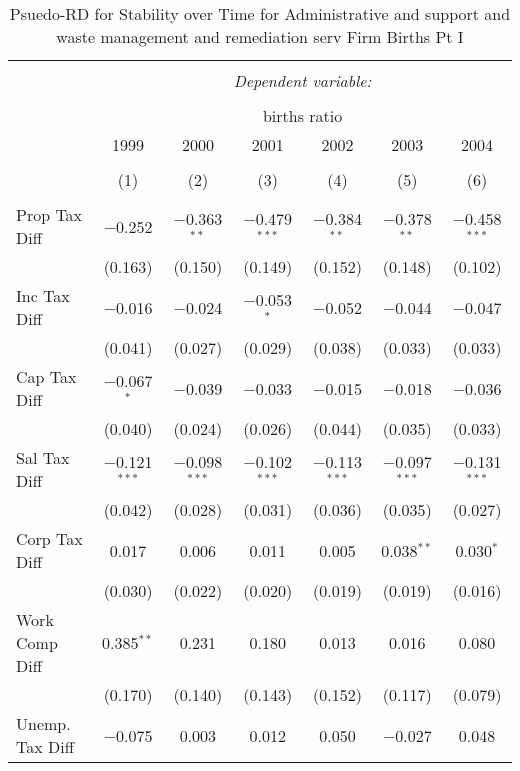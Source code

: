 
\begin{table}[!htbp] \centering 
  \caption{Psuedo-RD for Stability over Time for  Administrative and support and waste management and remediation serv Firm Births Pt I} 
  \label{56year} 
\small 
\begin{tabular}{@{\extracolsep{5pt}}lcccccc} 
\\[-1.8ex]\hline 
\hline \\[-1.8ex] 
 & \multicolumn{6}{c}{\textit{Dependent variable:}} \\ 
\cline{2-7} 
\\[-1.8ex] & \multicolumn{6}{c}{births ratio} \\ 
 & 1999 & 2000 & 2001 & 2002 & 2003 & 2004 \\ 
\\[-1.8ex] & (1) & (2) & (3) & (4) & (5) & (6)\\ 
\hline \\[-1.8ex] 
 Prop Tax Diff & $-$0.252 & $-$0.363$^{**}$ & $-$0.479$^{***}$ & $-$0.384$^{**}$ & $-$0.378$^{**}$ & $-$0.458$^{***}$ \\ 
  & (0.163) & (0.150) & (0.149) & (0.152) & (0.148) & (0.102) \\ 
  Inc Tax Diff & $-$0.016 & $-$0.024 & $-$0.053$^{*}$ & $-$0.052 & $-$0.044 & $-$0.047 \\ 
  & (0.041) & (0.027) & (0.029) & (0.038) & (0.033) & (0.033) \\ 
  Cap Tax Diff & $-$0.067$^{*}$ & $-$0.039 & $-$0.033 & $-$0.015 & $-$0.018 & $-$0.036 \\ 
  & (0.040) & (0.024) & (0.026) & (0.044) & (0.035) & (0.033) \\ 
  Sal Tax Diff & $-$0.121$^{***}$ & $-$0.098$^{***}$ & $-$0.102$^{***}$ & $-$0.113$^{***}$ & $-$0.097$^{***}$ & $-$0.131$^{***}$ \\ 
  & (0.042) & (0.028) & (0.031) & (0.036) & (0.035) & (0.027) \\ 
  Corp Tax Diff & 0.017 & 0.006 & 0.011 & 0.005 & 0.038$^{**}$ & 0.030$^{*}$ \\ 
  & (0.030) & (0.022) & (0.020) & (0.019) & (0.019) & (0.016) \\ 
  Work Comp Diff & 0.385$^{**}$ & 0.231 & 0.180 & 0.013 & 0.016 & 0.080 \\ 
  & (0.170) & (0.140) & (0.143) & (0.152) & (0.117) & (0.079) \\ 
  Unemp. Tax Diff & $-$0.075 & 0.003 & 0.012 & 0.050 & $-$0.027 & 0.048 \\ 

\end{tabular}
\end{table}
